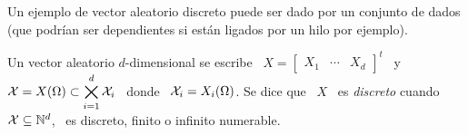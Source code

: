 
\label{Ssec:MP:VecDiscreto}

Un ejemplo de vector aleatorio discreto  puede ser dado por un conjunto de dados
(que podr\'ian ser dependientes si est\'an ligados por un hilo por ejemplo).

\begin{definicion}
\label{Def:MP:VectorAleatorioDiscreto}
%
  Un vector  aleatorio $d$-dimensional se escribe  \ $X =  \begin{bmatrix} X_1 &
    \cdots &  X_d \end{bmatrix}^t$ \ y  \ $\displaystyle \mathcal{X}  = X(\Omega) \subset
  \operatorname*{\bigtimes}_{i=1}^d \mathcal{X}_i$ \ donde \ $\mathcal{X}_i =  X_i(\Omega)$. Se dice que \ $X$ \ es
  {\it discreto} cuando $\mathcal{X} \subseteq \mathbb{N}^d$, \ es discreto, finito o infinito
  numerable.
\end{definicion}

